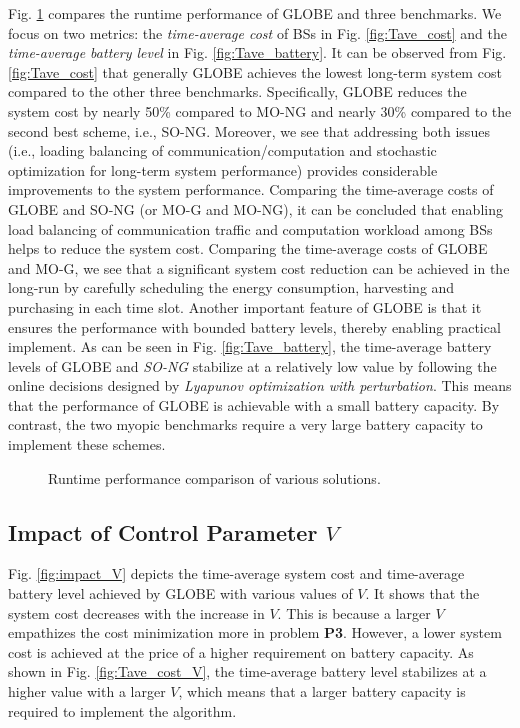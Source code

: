 \documentclass[12pt, draftclsnofoot, letterpaper, onecolumn]{IEEEtran}
\begin{document}
{Fig. \ref{fig:runtime_comp} compares the runtime performance of GLOBE and three benchmarks. We focus on two metrics: the \emph{time-average cost} of BSs in Fig. \ref{fig:Tave_cost} and the \emph{time-average battery level} in Fig. \ref{fig:Tave_battery}. It can be observed from Fig. \ref{fig:Tave_cost} that generally GLOBE achieves the lowest long-term system cost compared to the other three benchmarks. Specifically, GLOBE reduces the system cost by nearly 50\% compared to MO-NG and nearly 30\% compared to the second best scheme, i.e., SO-NG. Moreover, we see that addressing both issues (i.e., loading balancing of communication/computation and stochastic optimization for long-term system performance) provides considerable improvements to the system performance. Comparing the time-average costs of GLOBE and SO-NG (or MO-G and MO-NG), it can be concluded that enabling load balancing of communication traffic and computation workload among BSs helps to reduce the system cost. Comparing the time-average costs of GLOBE and MO-G, we see that a significant system cost reduction can be achieved in the long-run by carefully scheduling the energy consumption, harvesting and purchasing in each time slot. Another important feature of GLOBE is that it ensures the performance with bounded battery levels, thereby enabling practical implement. As can be seen in Fig. \ref{fig:Tave_battery}, the time-average battery levels of GLOBE and \emph{SO-NG} stabilize at a relatively low value by following the online decisions designed by \emph{Lyapunov optimization with perturbation}. This means that the performance of GLOBE is achievable with a small battery capacity. By contrast, the two myopic benchmarks require a very large battery capacity to implement these schemes.

\begin{figure}[h]
	\centering	
\vspace{-10pt}
	\caption{Runtime performance comparison of various solutions.}
	\label{fig:runtime_comp}
\vspace{-30pt}
\end{figure}


\subsection{Impact of Control Parameter $V$}
Fig. \ref{fig:impact_V} depicts the time-average system cost and time-average battery level achieved by GLOBE with various values of $V$. It shows that the system cost decreases with the increase in $V$. This is because a larger $V$ empathizes the cost minimization more in problem \textbf{P3}. However, a lower system cost is achieved at the price of a higher requirement on battery capacity. As shown in Fig. \ref{fig:Tave_cost_V}, the time-average battery level stabilizes at a higher value with a larger $V$, which means that a larger battery capacity is required to implement the algorithm.


}
\end{document}
